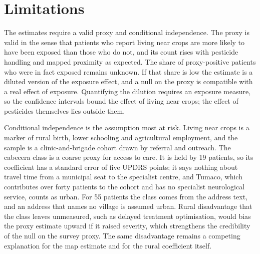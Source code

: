 \documentclass[11pt,a4paper]{article}
\begin{document}
\begin{table}[H]\centering\small
\caption{Severity and pesticide handling by number of life periods the map places within 500~m of cultivated land, geocoded patients}\label{tab:dose}

\end{table}

\section{Limitations}

The estimates require a valid proxy and conditional independence. The proxy is valid in the sense that patients who report living near crops are more likely to have been exposed than those who do not, and its count rises with pesticide handling and mapped proximity as expected. The share of proxy-positive patients who were in fact exposed remains unknown. If that share is low the estimate is a diluted version of the exposure effect, and a null on the proxy is compatible with a real effect of exposure. Quantifying the dilution requires an exposure measure, so the confidence intervals bound the effect of living near crops; the effect of pesticides themselves lies outside them.

Conditional independence is the assumption most at risk. Living near crops is a marker of rural birth, lower schooling and agricultural employment, and the sample is a clinic-and-brigade cohort drawn by referral and outreach. The cabecera class is a coarse proxy for access to care. It is held by 19 patients, so its coefficient has a standard error of five UPDRS points; it says nothing about travel time from a municipal seat to the specialist centre, and Tumaco, which contributes over forty patients to the cohort and has no specialist neurological service, counts as urban. For 55 patients the class comes from the address text, and an address that names no village is assumed urban. Rural disadvantage that the class leaves unmeasured, such as delayed treatment optimisation, would bias the proxy estimate upward if it raised severity, which strengthens the credibility of the null on the survey proxy. The same disadvantage remains a competing explanation for the map estimate and for the rural coefficient itself.
\end{document}
